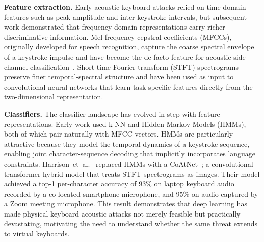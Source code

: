 \documentclass[conference]{IEEEtran}
\begin{document}
\textbf{Feature extraction.}
Early acoustic keyboard attacks relied on time-domain features such
as peak amplitude and inter-keystroke intervals, but subsequent work demonstrated that frequency-domain representations carry richer
discriminative information.
Mel-frequency cepstral coefficients (MFCCs), originally developed for
speech recognition, capture the coarse spectral envelope of a
keystroke impulse and have become the de-facto feature for acoustic
side-channel classification~\cite{zhuang2005,harrison2023}.
Short-time Fourier transform (STFT) spectrograms preserve finer
temporal-spectral structure and have been used as input to
convolutional neural networks that learn task-specific features
directly from the two-dimensional representation.

\textbf{Classifiers.}
The classifier landscape has evolved in step with feature representations.
Early work used k-NN and Hidden Markov Models (HMMs), both of which pair naturally with MFCC vectors.
HMMs are particularly attractive because they model the temporal
dynamics of a keystroke sequence, enabling joint character-sequence
decoding that implicitly incorporates language constraints.
Harrison~et~al.~\cite{harrison2023deep} replaced HMMs with a
CoAtNet~\cite{dai2021coatnet}; a convolutional-transformer hybrid model that treats STFT spectrograms as images. Their model achieved a top-1 per-character accuracy of 93\% on laptop keyboard audio recorded by a co-located smartphone microphone, and 95\% on audio captured by a Zoom meeting microphone.
This result demonstrates that deep learning has made physical
keyboard acoustic attacks not merely feasible but practically
devastating, motivating the need to understand whether the same
threat extends to virtual keyboards.

\end{document}
